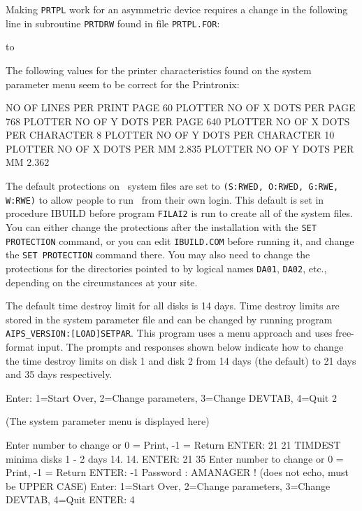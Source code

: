 Making {\tt PRTPL} work for an asymmetric device requires a change in the
following line in subroutine {\tt PRTDRW} found in file {\tt PRTPL.FOR}:
\medskip

\medskip

\noindent to\medskip

\medskip

The following values for the printer characteristics found on
the system parameter menu seem to be correct for the Printronix:
\medskip

\fortran
NO OF LINES PER PRINT PAGE            60
PLOTTER NO OF X DOTS PER PAGE        768
PLOTTER NO OF Y DOTS PER PAGE        640
PLOTTER NO OF X DOTS PER CHARACTER     8
PLOTTER NO OF Y DOTS PER CHARACTER    10
PLOTTER NO OF X DOTS PER MM            2.835
PLOTTER NO OF Y DOTS PER MM            2.362
\endfortran\medskip

\medskip{}

The default protections on \aips\ system files are set to {\tt (S:RWED, O:RWED,
G:RWE, W:RWE)} to allow people to run \aips\ from their own login.  This
default is set in procedure IBUILD before program {\tt FILAI2} is run to
create all of the system files.  You can either change the protections
after the installation with the {\tt SET PROTECTION} command, or you can edit
{\tt IBUILD.COM} before running it, and change the {\tt SET PROTECTION} command
there.  You may also need to change the protections for the directories
pointed to by logical names {\tt DA01}, {\tt DA02}, etc., depending on the
circumstances at your site.

\medskip{}

The default time destroy limit for all disks is 14 days.  Time destroy
limits are stored in the system parameter file and can be changed by
running program {\tt AIPS\_VERSION:[LO\-AD]SET\-PAR}.  This program uses a menu
approach and uses free-format input.  The prompts and responses shown below
indicate how to change the time destroy limits on disk 1 and disk 2
from 14 days (the default) to 21 days and 35 days respectively.
\medskip

\fortran
Enter:  1=Start Over, 2=Change parameters, 3=Change DEVTAB, 4=Quit
2

(The system parameter menu is displayed here)

Enter number to change or  0 = Print, -1 = Return
ENTER: 21
21  TIMDEST minima disks 1 - 2 days 14.  14.
ENTER: 21 35
Enter number to change or  0 = Print, -1 = Return
ENTER: -1
Password : AMANAGER     ! (does not echo, must be UPPER CASE)
Enter:  1=Start Over, 2=Change parameters, 3=Change DEVTAB, 4=Quit
ENTER: 4
\endfortran

